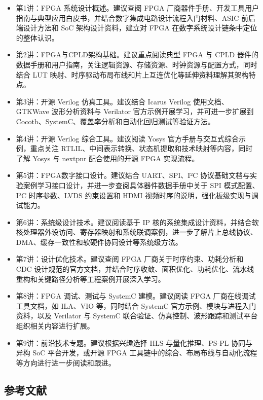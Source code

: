 \begin{itemize}
\item
  第1讲：FPGA 系统设计概述。建议查阅 FPGA
  厂商器件手册、开发工具用户指南与典型应用白皮书，并结合数字集成电路设计流程入门材料、ASIC
  前后端设计方法和 SoC 架构设计资料，建立对 FPGA
  在数字系统设计链条中定位的整体认识。
\item
  第2讲：FPGA与CPLD架构基础。建议重点阅读典型 FPGA 与 CPLD
  器件的数据手册和用户指南，关注逻辑资源、存储资源、时钟资源与配置方式，同时结合
  LUT 映射、时序驱动布局布线和片上互连优化等延伸资料理解其架构特点。
\item
  第3讲：开源 Verilog 仿真工具。建议结合 Icarus Verilog
  使用文档、GTKWave 波形分析资料与 Verilator
  官方示例开展学习，并可进一步扩展到
  Cocotb、SystemC、覆盖率分析和自动化回归测试等验证方法。
\item
  第4讲：开源 Verilog 综合工具。建议阅读 Yosys
  官方手册与交互式综合示例，重点关注
  RTLIL、中间表示转换、状态机提取和技术映射等内容，同时了解 Yosys 与
  nextpnr 配合使用的开源 FPGA 实现流程。
\item
  第5讲：FPGA数字接口设计。建议结合 UART、SPI、I²C
  协议基础文档与实验案例学习接口设计，并进一步查阅具体器件数据手册中关于
  SPI 模式配置、I²C 时序参数、LVDS 约束设置和 HDMI
  视频时序的说明，强化板级实现与调试能力。
\item
  第6讲：系统级设计技术。建议阅读基于 IP
  核的系统集成设计资料，并结合软核处理器外设访问、寄存器映射和系统联调案例，进一步了解片上总线协议、DMA、缓存一致性和软硬件协同设计等系统级方法。
\item
  第7讲：设计优化技术。建议查阅 FPGA 厂商关于时序约束、功耗分析和 CDC
  设计规范的官方文档，并结合时序收敛、面积优化、功耗优化、流水线重构和关键路径分析等工程案例开展深入学习。
\item
  第8讲：FPGA 调试、测试与 SystemC 建模。建议阅读 FPGA
  厂商在线调试工具文档，如 ILA、VIO 等，同时结合 SystemC
  官方示例、模块与进程入门资料，以及 Verilator 与 SystemC
  联合验证、仿真控制、波形跟踪和测试平台组织相关内容进行扩展。
\item
  第9讲：前沿技术专题。建议根据兴趣选择 HLS 与量化推理、PS-PL 协同与异构
  SoC 平台开发，或开源 FPGA
  工具链中的综合、布局布线与自动化流程等方向进行进一步阅读和跟进。
\end{itemize}

\subsection*{参考文献}\label{参考文献}

